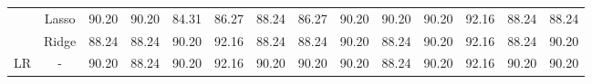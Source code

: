 \begin{landscape}
\begin{table}[]
{\begin{tabular}{cc|cccccccccccc}
                                & Lasso                                 & 90.20                                                             & 90.20                                                                & 84.31                                                                & 86.27                                                               & 88.24                                                            & \multicolumn{1}{c|}{86.27}                                                                   & 90.20                                                             & 90.20                                                                & 90.20                                                                & 92.16                                                               & 88.24                                                            & 88.24                                                                   \\ 
                                 & Ridge                                 & 88.24                                                             & 88.24                                                                & 90.20                                                                & 92.16                                                               & 88.24                                                            & \multicolumn{1}{c|}{88.24}                                                                   & 90.20                                                             & 88.24                                                                & 90.20                                                                & 92.16                                                               & 88.24                                                            & 90.20                                                                   \\ \hline
\multirow{3}{*}{LR}             & -                                     & 90.20                                                             & 88.24                                                                & 90.20                                                                & 92.16                                                               & 90.20                                                            & \multicolumn{1}{c|}{90.20}                                                                   & 90.20                                                             & 88.24                                                                & 90.20                                                                & 92.16                                                               & 90.20                                                            & 90.20                                                                   \\
                               

\end{tabular}}
\end{table}
\end{landscape}
